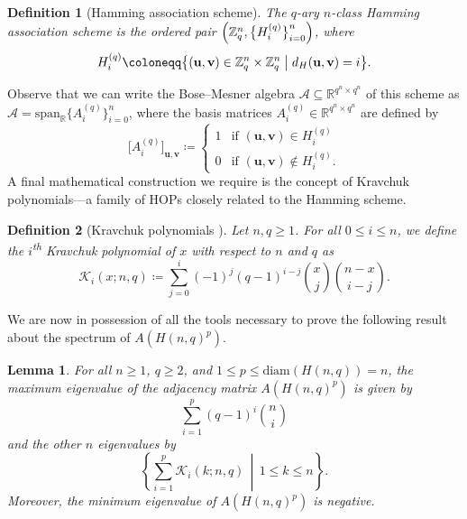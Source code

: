 \documentclass{article}
\def\Z{\mathbb{Z}}
\def\R{\mathbb{R}}
\def\K{\mathcal{K}}
\def\u{\mathbf{u}}
\def\vv{\mathbf{v}} %
\numberwithin{equation}{section}
\theoremstyle{plain}
\newtheorem{lemma}[theorem]{Lemma}
\newtheorem{definition}{Definition}
\begin{document}
\begin{definition}[Hamming association scheme]\label{defn:8}
    The $q$-ary $n$-class \emph{Hamming association scheme} is the ordered pair $\Bigl(\Z_q^n, \bigl\{H_i^{(q)}\bigr\}_{i = 0}^n\Bigr)$, where
    \[H_i^{(q)} \coloneqq \bigl\{(\u, \vv) \in \Z_q^n \times \Z_q^n \bigm| d_H(\u, \vv) = i\bigr\}.\]
\end{definition}

Observe that we can write the Bose--Mesner algebra $\mathcal{A} \subseteq \R^{q^n \times q^n}$ of this scheme as $\mathcal{A} = \mathrm{span}_\R\bigl\{A_i^{(q)}\bigr\}_{i = 0}^n$, where the basis matrices $A_i^{(q)} \in \R^{q^n \times q^n}$ are defined by
\[\bigl[A_i^{(q)}\bigr]_{\u,\vv} \coloneqq \begin{cases}
    1 & \text{if } (\u, \vv) \in H_i^{(q)} \\
    0 & \text{if } (\u, \vv) \notin H_i^{(q)}.
\end{cases}\]
A final mathematical construction we require is the concept of Kravchuk polynomials---a family of HOPs closely related to the Hamming scheme.

\begin{definition}[Kravchuk polynomials \cite{Kra29}]\label{defn:9}
    Let $n, q \ge 1$. For all $0 \le i \le n$, we define the $i$\textsuperscript{th} \emph{Kravchuk polynomial} of $x$ with respect to $n$ and $q$ as
    \[\K_i(x; n, q) \coloneqq \sum_{j = 0}^i (-1)^j (q - 1)^{i - j} \binom{x}{j} \binom{n - x}{i - j}.\]
\end{definition}

We are now in possession of all the tools necessary to prove the following result about the spectrum of $A(H(n, q)^p)$.

\begin{lemma}\label{lemma:3.1}
    For all $n \ge 1$, $q \ge 2$, and $1 \le p \le \mathrm{diam}(H(n, q)) = n$, the maximum eigenvalue of the adjacency matrix $A(H(n, q)^p)$ is given by
    \[\sum_{i = 1}^p (q - 1)^i \binom{n}{i}\]
    and the other $n$ eigenvalues by
    \[\left\{\sum_{i = 1}^p \K_i(k; n, q)\, \middle|\, 1 \le k \le n\right\}.\]
    Moreover, the minimum eigenvalue of $A(H(n, q)^p)$ is negative.
\end{lemma}
\end{document}
